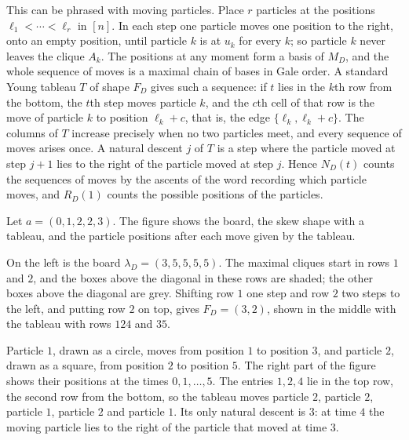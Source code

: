 This can be phrased with moving particles.  Place $r$ particles at the
positions $\ell_1<\dotsb<\ell_r$ in $[n]$.  In each step one particle moves one
position to the right, onto an empty position, until particle $k$ is at $u_k$
for every $k$; so particle $k$ never leaves the clique $A_k$.  The positions
at any moment form a basis of $M_D$, and the whole sequence of moves is a
maximal chain of bases in Gale order.  A standard Young tableau $T$ of shape
$F_D$ gives such a sequence: if $t$ lies in the $k$th row from the bottom, the
$t$th step moves particle $k$, and the $c$th cell of that row is the move of
particle $k$ to position $\ell_k+c$, that is, the edge $\{\ell_k,\ell_k+c\}$.
The columns of $T$ increase precisely when no two particles meet, and every
sequence of moves arises once.  A natural descent $j$ of $T$ is a step where
the particle moved at step $j+1$ lies to the right of the particle moved at
step $j$.  Hence $N_D(t)$ counts the sequences of moves by the ascents of the
word recording which particle moves, and $R_D(1)$ counts the possible
positions of the particles.

\begin{example*}
Let $a=(0,1,2,2,3)$.  The figure shows the board, the skew shape with a
tableau, and the particle positions after each move given by the tableau.
\begin{figure}
\end{figure}

On the left is the board $\lambda_D=(3,5,5,5,5)$.  The maximal cliques start
in rows $1$ and $2$, and the boxes above the diagonal in these rows are
shaded; the other boxes above the diagonal are grey.
Shifting row $1$ one step and row $2$ two steps to the left, and putting row
$2$ on top, gives $F_D=(3,2)$, shown in the middle with the tableau with rows
$124$ and $35$.

Particle $1$, drawn as a circle, moves from position $1$ to position $3$, and
particle $2$, drawn as a square, from position $2$ to position $5$.  The right part of the
figure shows their positions at the times $0,1,\dotsc,5$.  The entries $1,2,4$
lie in the top row, the second row from the bottom, so the tableau moves
particle $2$, particle $2$, particle $1$, particle $2$ and particle $1$.  Its
only natural descent is $3$: at time $4$ the moving particle lies to the
right of the particle that moved at time $3$.
\end{example*}

